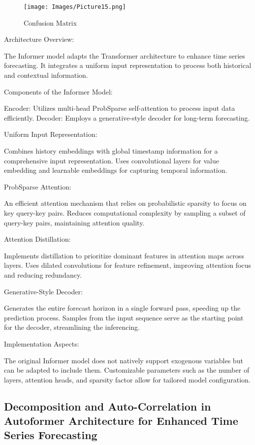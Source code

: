 \documentclass{article}
\begin{document}
\begin{figure}
    \centering
    \texttt{[image: Images/Picture15.png]}
    \caption{Confusion Matrix}
    \label{fig:enter-labe}
\end{figure}

Architecture Overview:

The Informer model adapts the Transformer architecture to enhance time series forecasting.
It integrates a uniform input representation to process both historical and contextual information.

Components of the Informer Model:

Encoder: Utilizes multi-head ProbSparse self-attention to process input data efficiently.
Decoder: Employs a generative-style decoder for long-term forecasting.

Uniform Input Representation:

Combines history embeddings with global timestamp information for a comprehensive input representation.
Uses convolutional layers for value embedding and learnable embeddings for capturing temporal information.

ProbSparse Attention:

An efficient attention mechanism that relies on probabilistic sparsity to focus on key query-key pairs.
Reduces computational complexity by sampling a subset of query-key pairs, maintaining attention quality.

Attention Distillation:

Implements distillation to prioritize dominant features in attention maps across layers.
Uses dilated convolutions for feature refinement, improving attention focus and reducing redundancy.

Generative-Style Decoder:

Generates the entire forecast horizon in a single forward pass, speeding up the prediction process.
Samples from the input sequence serve as the starting point for the decoder, streamlining the inferencing.

Implementation Aspects:

The original Informer model does not natively support exogenous variables but can be adapted to include them.
Customizable parameters such as the number of layers, attention heads, and sparsity factor allow for tailored model configuration.

\subsection{Decomposition and Auto-Correlation in Autoformer Architecture for Enhanced Time Series Forecasting}
\end{document}
